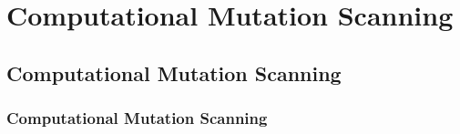 \chapter{Computational Mutation Scanning}
\label{chapter:mutations}
\section{Computational Mutation Scanning}
\label{section:mutations}
\subsection{Computational Mutation Scanning}
\label{subsection:mutations}
\cite{jacobson2004hierarchical}
